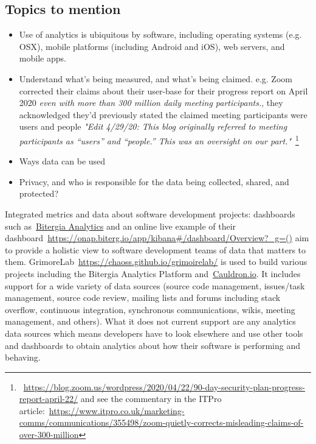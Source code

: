 \subsection{Topics to mention}
\begin{itemize}
    \item Use of analytics is ubiquitous by software, including operating systems (e.g. OSX), mobile platforms (including Android and iOS), web servers, and mobile apps. 
    \item Understand what's being measured, and what's being claimed. e.g. Zoom corrected their claims about their user-base for their progress report on  April 2020 \emph{even with more than 300 million daily meeting participants.}, they acknowledged they'd previously stated the claimed meeting participants were users and people \emph{"Edit 4/29/20: This blog originally referred to meeting participants as “users” and “people.” This was an oversight on our part."}~\footnote{~\url{https://blog.zoom.us/wordpress/2020/04/22/90-day-security-plan-progress-report-april-22/} and see the commentary in the ITPro article:~\url{https://www.itpro.co.uk/marketing-comms/communications/355498/zoom-quietly-corrects-misleading-claims-of-over-300-million}}
    \item Ways data can be used
    \item Privacy, and who is responsible for the data being collected, shared, and protected?
\end{itemize}

Integrated metrics and data about software development projects: dashboards such as~\href{https://bitergia.com/bitergia-analytics/}{Bitergia Analytics} and an online live example of their dashboard~\url{https://onap.biterg.io/app/kibana#/dashboard/Overview?_g=()} aim to provide a holistic view to software development teams of data that matters to them. 
GrimoreLab~\url{https://chaoss.github.io/grimoirelab/} is used to build various projects including the Bitergia Analytics Platform and~\href{https://cauldron.io/dashboard/1640}{Cauldron.io}. It includes support for a wide variety of data sources (source code management, issues/task management, source code review, mailing lists and forums including stack overflow, continuous integration, synchronous communications, wikis, meeting management, and others). What it does not current support are any analytics data sources which means developers have to look elsewhere and use other tools and dashboards to obtain analytics about how their software is performing and behaving. 



